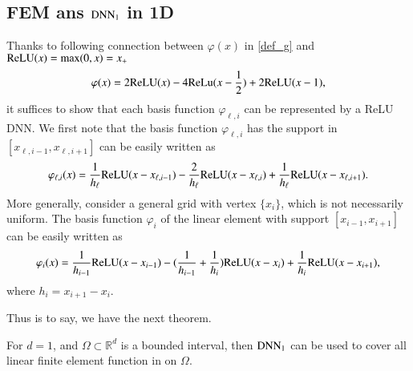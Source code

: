 \subsection{FEM ans ${\rm DNN}_1$ in 1D}
Thanks to following connection between $\varphi(x)$ in \eqref{def_g} and ${\rm ReLU}(x) = \max(0,x )=x_+$
\begin{equation}\label{key}
\varphi(x) = 2{\rm ReLU}(x) - 4{\rm ReLu}({x-\frac{1}{2}}) + 2{\rm ReLU}(x-1),
\end{equation}
it suffices to show that each basis
function $\varphi_{\ell,i}$ can be represented by a ReLU DNN. 
We first note that  the basis
function $\varphi_{\ell,i}$ has the support in $[x_{\ell,i-1},
x_{\ell,i+1} ]$ can be easily written as
\begin{equation}
\label{1d-basisu}
\varphi_{\ell,i}(x) = \frac{1}{h_{\ell}}{\rm ReLU}(x-x_{\ell,i-1}) -\frac{2}{h_{\ell}}{\rm ReLU}(x-x_{\ell,i}) +\frac{1}{h_\ell}{\rm ReLU}(x-x_{\ell,i+1}).
\end{equation}
More generally, consider a general  grid with vertex $\{x_i\}$, which is not necessarily uniform. The basis function $\varphi_i$ of the linear element with support $[x_{i-1},
x_{i+1} ]$ can be easily written as
\begin{equation}
\label{1d-basis}
\varphi_i(x) = \frac{1}{h_{i-1}}{\rm ReLU}(x-x_{i-1}) -(\frac{1}{h_{i-1}}+\frac{1}{h_i}){\rm ReLU}(x-x_i) +\frac{1}{h_i}{\rm ReLU}(x-x_{i+1}),
\end{equation}
where $h_i = x_{i+1} - x_i$.

Thus is to say, we have the next theorem.
\begin{theorem}\label{thm:1dLFEMDNN}
	For $d=1$, and  $\Omega\subset \mathbb R^d$ is 
	a bounded interval, then ${\rm DNN}_1$ can be used to cover all linear finite element 
	function in on $\Omega$.
\end{theorem}